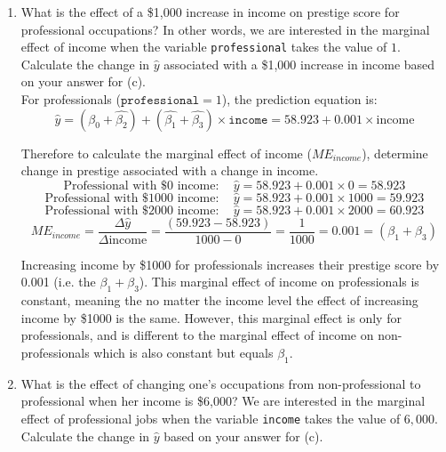 \documentclass[12pt,letterpaper]{article}
\begin{document}
\begin{enumerate}
	\newpage
	\item [(f)]
	What is the effect of a \$1,000 increase in income on prestige score for professional occupations? In other words, we are interested in the marginal effect of income when the variable \texttt{professional} takes the value of $1$. Calculate the change in $\hat{y}$ associated with a \$1,000 increase in income based on your answer for (c). \\
	
	For professionals ($\texttt{professional} = 1$), the prediction equation  is: 
	\begin{equation}
		\hat{y} = (\hat{\beta_0} + \hat{\beta_2}) +  (\hat{\beta_1} + \hat{\beta_3})\times \texttt{income} = 58.923 + 0.001 \times\text{income}
	\end{equation}

	Therefore to calculate the marginal effect of income ($ME_{income}$), determine change in prestige associated with a change in income. 
	\begin{equation}
		\text{Professional with \$0 income}: \quad \hat{y} = 58.923 + 0.001 \times 0 = 58.923
	\end{equation}
	\begin{equation}
		\text{Professional with \$1000 income}: \quad \hat{y} = 58.923 + 0.001 \times 1000 = 59.923
	\end{equation}
	\begin{equation}
		\text{Professional with \$2000 income}: \quad \hat{y} = 58.923 + 0.001 \times 2000 = 60.923
	\end{equation}
	\begin{equation}
		ME_{income} = \frac{\Delta\hat{y}}{\Delta\text{income}} = \frac{(59.923-58.923)}{1000-0} =\frac{1}{1000} = 0.001 = (\beta_1 + \beta_3)
	\end{equation}
	
	Increasing income by \$1000 for professionals increases their prestige score by 0.001 (i.e. the $\beta_1 +\beta_3$). This marginal effect of income on professionals is constant, meaning the no matter the income level the effect of increasing income by \$1000 is the same. However, this marginal effect is only for professionals, and is different to the marginal effect of income on non-professionals which is also constant but equals $\beta_1$. 
	
	
	\vspace{0.75cm}
	
	
	\item [(g)]
	What is the effect of changing one's occupations from non-professional to professional when her income is \$6,000? We are interested in the marginal effect of professional jobs when the variable \texttt{income} takes the value of $6,000$. Calculate the change in $\hat{y}$ based on your answer for (c).
	

\end{enumerate}
\end{document}
